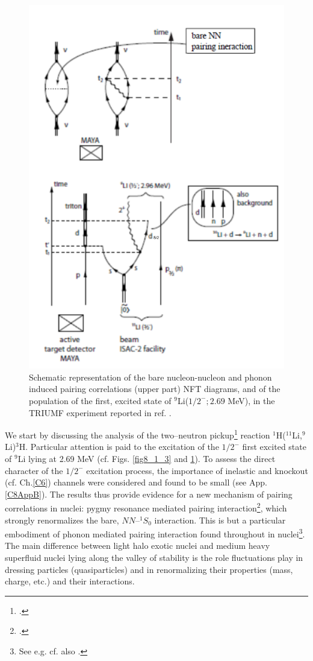  \begin{figure}
 \centerline{\includegraphics*[width=15cm,angle=0]{C8/figsC8/fig8_1_1}}
 	\caption{Schematic representation of the bare nucleon-nucleon and phonon induced pairing correlations (upper part) NFT diagrams, and of the population of the first, excited state of $^{9}$Li($1/2^{-}; 2.69$ MeV), in the TRIUMF experiment  reported in ref. \cite{Tanihata:08}.}\label{fig8_1_1}
 \end{figure}
 We start by discussing  the analysis of the two--neutron pickup\footnote{ \cite{Tanihata:08}.} reaction $^1$H($^{11}$Li,$^9$Li)$^3$H. Particular  attention is paid to the  excitation of the $1/2^-$ first excited state of $^9$Li lying at 2.69 MeV (cf. Figs. \ref{fig8_1_3} and \ref{fig8_1_1}). To assess the direct character of the $1/2^-$ excitation process, the importance of inelastic  and knockout (cf. Ch.\ref{C6}) channels were considered and found to be small (see App. \ref{C8AppB}). The results thus provide evidence for a new mechanism of pairing correlations in nuclei: pygmy resonance mediated pairing interaction\footnote{\citet{Barranco:01,Potel:10}.}, which strongly renormalizes the bare, $NN$--$^1S_0$ interaction. This is but a particular embodiment of phonon mediated pairing interaction found throughout in nuclei\footnote{See e.g. \citet{Barranco:99,Gori:04} cf. also \citet{Brink:05}.}. The main difference between light halo exotic nuclei and medium heavy superfluid nuclei lying along the valley of stability is the role fluctuations play in dressing particles (quasiparticles) and in renormalizing their properties (mass, charge, etc.) and their interactions.
